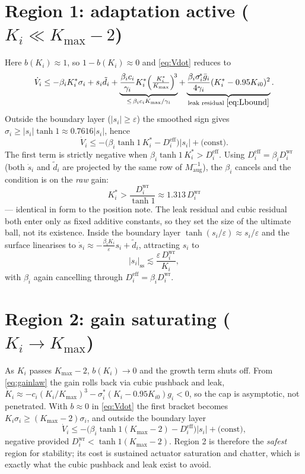 \documentclass[11pt]{article}
\theoremstyle{plain}
\theoremstyle{definition}
\newcommand{\Maug}{M_{\mathrm{aug}}}
\newcommand{\Deff}{D^{\mathrm{eff}}}
\newcommand{\Dwr}{D^{\mathrm{wr}}}
\newcommand{\Kmax}{K_{\max}}
\newcommand{\Tr}[1]{\tanh\!\left(#1\right)}
\begin{document}
\section{Region 1: adaptation active ($K_i\ll\Kmax-2$)}
\label{sec:region1}
Here $b(K_i)\approx1$, so $1-b(K_i)\approx0$ and \eqref{eq:Vdot} reduces to
\begin{equation}
\dot V_i\le-\beta_iK_i^*\sigma_i+s_i\tilde d_i
+\underbrace{\frac{\beta_ic_i}{\gamma_i}K_i^*\Big(\tfrac{K_i^*}{\Kmax}\Big)^{\!3}}_{\le\,\beta_ic_i\Kmax/\gamma_i}
+\underbrace{\frac{\beta_i\sigma^{\!*}_i\bar g_i}{4\gamma_i}(K_i^*-0.95K_{i0})^2}_{\text{leak residual }\eqref{eq:Lbound}} .
\label{eq:region1}
\end{equation}
Outside the boundary layer ($|s_i|\ge\varepsilon$) the smoothed sign gives
$\sigma_i\ge|s_i|\tanh1\approx0.7616|s_i|$, hence
\begin{equation}
\dot V_i\le-\big(\beta_i\tanh1\,K_i^*-\Deff_i\big)|s_i|+\text{(const)} .
\end{equation}
The first term is strictly negative when $\beta_i\tanh1\,K_i^*>\Deff_i$. Using
$\Deff_i=\beta_i\Dwr_i$ (both $\dot s_i$ and $\tilde d_i$ are projected by the same row
of $\Maug^{-1}$), the $\beta_i$ cancels and the condition is on the \emph{raw} gain:
\begin{equation}
\boxed{\;K_i^*>\frac{\Dwr_i}{\tanh1}\approx1.313\,\Dwr_i\;}
\label{eq:B1raw}
\end{equation}
--- identical in form to the position note. The leak residual and cubic residual
both enter only as fixed additive constants, so they set the size of the ultimate
ball, not its existence. Inside the boundary layer $\Tr{s_i/\varepsilon}\approx
s_i/\varepsilon$ and the surface linearises to
$\dot s_i\approx-\tfrac{\beta_iK_i}{\varepsilon}s_i+\tilde d_i$, attracting $s_i$ to
\begin{equation}
|s_i|_{\mathrm{ss}}\lesssim\frac{\varepsilon\,\Dwr_i}{K_i},
\label{eq:ss}
\end{equation}
with $\beta_i$ again cancelling through $\Deff_i=\beta_i\Dwr_i$.

\section{Region 2: gain saturating ($K_i\to\Kmax$)}
\label{sec:region2}
As $K_i$ passes $\Kmax-2$, $b(K_i)\to0$ and the growth term shuts off. From
\eqref{eq:gainlaw} the gain rolls back via cubic pushback and leak,
$\dot K_i\approx-c_i(K_i/\Kmax)^3-\sigma^{\!*}_i(K_i-0.95K_{i0})g_i<0$, so the cap is
asymptotic, not penetrated. With $b\approx0$ in \eqref{eq:Vdot} the first bracket
becomes $K_i\sigma_i\ge(\Kmax-2)\sigma_i$, and outside the boundary layer
\begin{equation}
\dot V_i\le-\big(\beta_i\tanh1(\Kmax-2)-\Deff_i\big)|s_i|+\text{(const)},
\end{equation}
negative provided $\Dwr_i<\tanh1(\Kmax-2)$. Region 2 is therefore the
\emph{safest} region for stability; its cost is sustained actuator saturation and
chatter, which is exactly what the cubic pushback and leak exist to avoid.
\end{document}

